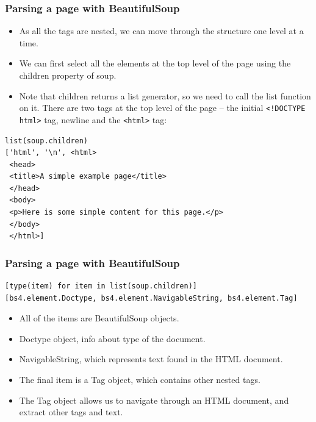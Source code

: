 \begin{frame}[fragile]\frametitle{Parsing a page with BeautifulSoup}
    \begin{itemize}
    \item As all the tags are nested, we can move through the structure one level at a time.
    \item We can first select all the elements at the top level of the page using the children property of soup.
    \item Note that children returns a list generator, so we need to call the list function on it. There are two tags at the top level of the page -- the initial \lstinline|<!DOCTYPE html>| tag, newline and the \lstinline|<html>| tag:
    \end{itemize}
        \begin{lstlisting}
list(soup.children)
['html', '\n', <html>
 <head>
 <title>A simple example page</title>
 </head>
 <body>
 <p>Here is some simple content for this page.</p>
 </body>
 </html>]
\end{lstlisting}
\end{frame}

\begin{frame}[fragile]\frametitle{Parsing a page with BeautifulSoup}

        \begin{lstlisting}
[type(item) for item in list(soup.children)]
[bs4.element.Doctype, bs4.element.NavigableString, bs4.element.Tag]
\end{lstlisting}

    \begin{itemize}
    \item All of the items are BeautifulSoup objects. 
    \item Doctype object, info about type of the document.
    \item NavigableString, which represents text found in the HTML document. 
    \item The final item is a Tag object, which contains other nested tags.
    \item The Tag object allows us to navigate through an HTML document, and extract other tags and text. 
    \end{itemize}
\end{frame}

